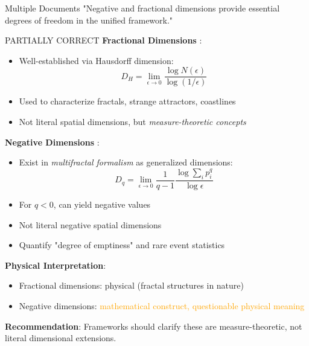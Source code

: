 \begin{frameworkclaim}{Multiple Documents}
"Negative and fractional dimensions provide essential degrees of freedom in the unified framework."
\end{frameworkclaim}

\begin{factcheck}{PARTIALLY CORRECT}
\textbf{Fractional Dimensions} \cite{falconer2004fractal,mandelbrot1967selfsimilar}:
\begin{itemize}
    \item[$+$] \textcolor{validcolor}{Well-established} via Hausdorff dimension:
    \begin{equation}
    D_H = \lim_{\epsilon \to 0} \frac{\log N(\epsilon)}{\log(1/\epsilon)}
    \end{equation}
    \item[$+$] Used to characterize fractals, strange attractors, coastlines
    \item[$+$] Not literal spatial dimensions, but \textit{measure-theoretic concepts}
\end{itemize}

\textbf{Negative Dimensions} \cite{hausdorff1919dimension}:
\begin{itemize}
    \item[$\sim$] Exist in \textit{multifractal formalism} as generalized dimensions:
    \begin{equation}
    D_q = \lim_{\epsilon \to 0} \frac{1}{q-1} \frac{\log \sum_i p_i^q}{\log \epsilon}
    \end{equation}
    \item[$\sim$] For $q < 0$, can yield negative values
    \item[$-$] Not literal negative spatial dimensions
    \item[$-$] Quantify "degree of emptiness" and rare event statistics
\end{itemize}

\textbf{Physical Interpretation}:
\begin{itemize}
    \item[$+$] Fractional dimensions: physical (fractal structures in nature)
    \item[$-$] Negative dimensions: \textcolor{orange}{mathematical construct, questionable physical meaning}
\end{itemize}

\textbf{Recommendation}: Frameworks should clarify these are measure-theoretic, not literal dimensional extensions.
\end{factcheck}


